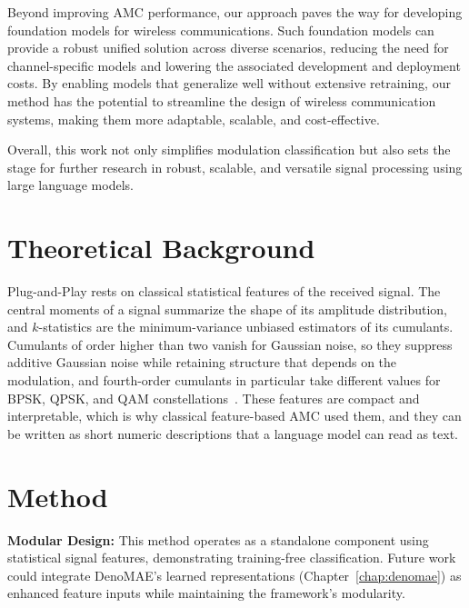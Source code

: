Beyond improving AMC performance, our approach paves the way for developing foundation models for wireless communications. Such foundation models can provide a robust unified solution across diverse scenarios, reducing the need for channel-specific models and lowering the associated development and deployment costs. By enabling models that generalize well without extensive retraining, our method has the potential to streamline the design of wireless communication systems, making them more adaptable, scalable, and cost-effective.

Overall, this work not only simplifies modulation classification but also sets the stage for further research in robust, scalable, and versatile signal processing using large language models.


\section{Theoretical Background}
\label{sec:back}

Plug-and-Play rests on classical statistical features of the received signal. The central moments of a signal summarize the shape of its amplitude distribution, and $k$-statistics are the minimum-variance unbiased estimators of its cumulants. Cumulants of order higher than two vanish for Gaussian noise, so they suppress additive Gaussian noise while retaining structure that depends on the modulation, and fourth-order cumulants in particular take different values for BPSK, QPSK, and QAM constellations~\cite{swami2000hierarchical}. These features are compact and interpretable, which is why classical feature-based AMC used them, and they can be written as short numeric descriptions that a language model can read as text.

\section{Method}
\label{sec:meth}
\textbf{Modular Design:} This method operates as a standalone component using statistical signal features, demonstrating training-free classification. Future work could integrate DenoMAE's learned representations (Chapter~\ref{chap:denomae}) as enhanced feature inputs while maintaining the framework's modularity.

